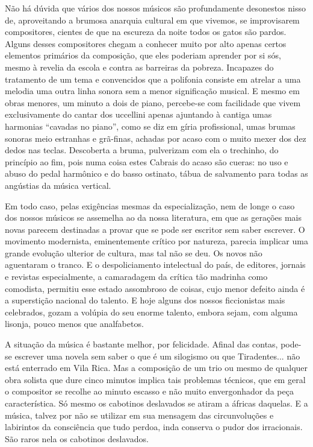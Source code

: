 Não há dúvida que vários dos nossos músicos são profundamente desonestos
nisso de, aproveitando a brumosa anarquia cultural em que vivemos, se
improvisarem compositores, cientes de que na escureza da noite todos os
gatos são pardos. Alguns desses compositores chegam a conhecer muito por
alto apenas certos elementos primários da composição, que eles poderiam
aprender por si sós, mesmo à revelia da escola e contra as barreiras da
pobreza. Incapazes do tratamento de um tema e convencidos que a
polifonia consiste em atrelar a uma melodia uma outra linha sonora sem a
menor significação musical. E mesmo em obras menores, um minuto a dois
de piano, percebe-se com facilidade que vivem exclusivamente do cantar
dos uccellini apenas ajuntando à cantiga umas harmonias ``cavadas no
piano'', como se diz em gíria profissional, umas brumas sonoras meio
estranhas e grã-finas, achadas por acaso com o muito mexer dos dez dedos
nas teclas. Descoberta a bruma, pulverizam com ela o trechinho, do
princípio ao fim, pois numa coisa estes Cabrais do acaso são cueras: no
uso e abuso do pedal harmônico e do basso ostinato, tábua de salvamento
para todas as angústias da música vertical.

Em todo caso, pelas exigências mesmas da especialização, nem de longe o
caso dos nossos músicos se assemelha ao da nossa literatura, em que as
gerações mais novas parecem destinadas a provar que se pode ser escritor
sem saber escrever. O movimento modernista, eminentemente crítico por
natureza, parecia implicar uma grande evolução ulterior de cultura, mas
tal não se deu. Os novos não aguentaram o tranco. E o despoliciamento
intelectual do país, de editores, jornais e revistas especialmente, a
camaradagem da crítica tão madrinha como comodista, permitiu esse estado
assombroso de coisas, cujo menor defeito ainda é a superstição nacional
do talento. E hoje alguns dos nossos ficcionistas mais celebrados, gozam
a volúpia do seu enorme talento, embora sejam, com alguma lisonja, pouco
menos que analfabetos.

A situação da música é bastante melhor, por felicidade. Afinal das
contas, pode-se escrever uma novela sem saber o que é um silogismo ou
que Tiradentes... não está enterrado em Vila Rica. Mas a composição de
um trio ou mesmo de qualquer obra solista que dure cinco minutos implica
tais problemas técnicos, que em geral o compositor se recolhe ao minuto
escasso e não muito envergonhador da peça característica. Só mesmo os
cabotinos deslavados se atiram a áfricas daquelas. E a música, talvez
por não se utilizar em sua mensagem das circunvoluções e labirintos da
consciência que tudo perdoa, inda conserva o pudor dos irracionais. São
raros nela os cabotinos deslavados.


